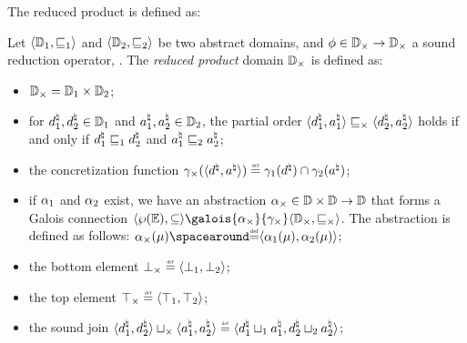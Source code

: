 The reduced product is defined as:

\begin{definition}
Let $\langle \mathbb{D}_1, \sqsubseteq_1 \rangle$ and $\langle \mathbb{D}_2, \sqsubseteq_2 \rangle$ be two abstract domains, and $\phi\in\mathbb{D}_{\times}\to\mathbb{D}_{\times}$ a sound reduction operator, \cf{} .
The \emph{reduced product} domain $\mathbb{D}_{\times}$ is defined as:
\begin{itemize}
  \item $\mathbb{D}_{\times} = \mathbb{D}_1 \times \mathbb{D}_2$;
  \item for $d^\natural_1, d^\natural_2 \in \mathbb{D}_1$ and $a^\natural_1, a^\natural_2\in\mathbb{D}_2$, the partial order $\langle d^\natural_1, a^\natural_1 \rangle \sqsubseteq_{\times} \langle d^\natural_2, a^\natural_2 \rangle$ holds if and only if $d^\natural_1 \sqsubseteq_1 d^\natural_2$ and $a^\natural_1 \sqsubseteq_2 a^\natural_2$;
  \item the concretization function $\productdomainconcretization(\tuple{\defabstractvalue}{\defotherabstractvalue}) \defeq \abstractdomainconcretization_1(\defabstractvalue) \setmeet \abstractdomainconcretization_2(\defotherabstractvalue)$;
  \item if $\alpha_1$ and $\alpha_2$ exist, we have an abstraction $\alpha_{\times}\in\mathbb{D}\times\mathbb{D}\to\mathbb{D}$ that forms a Galois connection $\tuple{\setof\env}{\subseteq}\galois{\productdomainabstraction}{\productdomainconcretization}\tuple{\productdomain}{\productdomainsubseteq}$. The abstraction is defined as follows:
  $ \productdomainabstraction(\defenv) \DefeQ \tuple{\abstractdomainabstraction_1(\defenv)}{\abstractdomainabstraction_2(\defenv)} $;
  \item the bottom element $\productdomainbottom \defeq \tuple{\abstractdomainbottom_1}{\abstractdomainbottom_2}$;
  \item the top element $\productdomaintop \defeq \tuple{\abstractdomaintop_1}{\abstractdomaintop_2}$;
  \item the sound join $\tuple{\defabstractvalue_1}{\defabstractvalue_2} \productdomainjoin \tuple{\defotherabstractvalue_1}{\defotherabstractvalue_2} \defeq \tuple{\defabstractvalue_1 \abstractdomainjoin_1 \defotherabstractvalue_1}{\defabstractvalue_2 \abstractdomainjoin_2 \defotherabstractvalue_2}$;

\end{itemize}
\end{definition}
